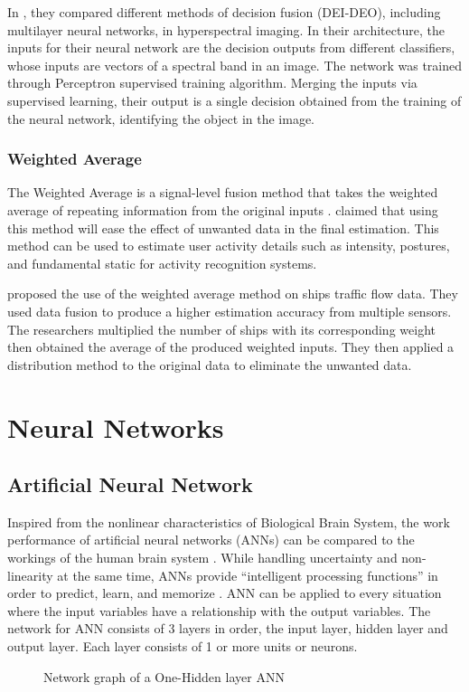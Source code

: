 In , they compared different methods of decision fusion (DEI-DEO), including multilayer neural networks, in hyperspectral imaging. In their architecture, the inputs for their neural network are the decision outputs from different classifiers, whose inputs are vectors of a spectral band in an image. The network was trained through Perceptron supervised training algorithm. Merging the inputs via supervised learning, their output is a single decision obtained from the training of the neural network, identifying the object in the image. 

\subsubsection{Weighted Average}
The Weighted Average is a signal-level fusion method that takes the weighted average of repeating information from the original inputs .  claimed that using this method will ease the effect of unwanted data in the final estimation. This method can be used to estimate user activity details such as intensity, postures, and fundamental static for activity recognition systems. 

 proposed the use of the weighted average method on ships traffic flow data. They used data fusion to produce a higher estimation accuracy from multiple sensors. The researchers multiplied the number of ships with its corresponding weight then obtained the average of the produced weighted inputs. They then applied a distribution method to the original data to eliminate the unwanted data. 



\section{Neural Networks}
\subsection{Artificial Neural Network}
Inspired from the nonlinear characteristics of Biological Brain System, the work performance of artificial neural networks (ANNs) can be compared to the workings of the human brain system . While handling uncertainty and non-linearity at the same time, ANNs provide “intelligent processing functions” in order to predict, learn, and memorize . 
ANN can be applied to every situation where the input variables have a relationship with the output variables. The network for ANN consists of 3 layers in order, the input layer, hidden layer and output layer. Each layer consists of 1 or more units or neurons. 
\begin{figure}[h]
	\centering
	\captionsetup{justification=centering}
	\caption{Network graph of a One-Hidden layer ANN}
	\label{fig:annexample}
\end{figure}

